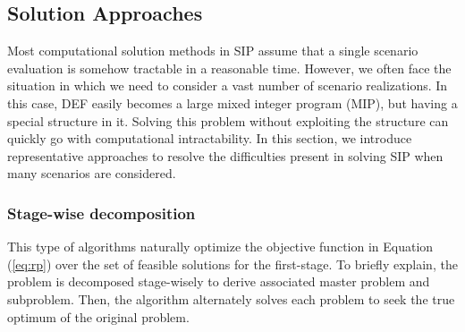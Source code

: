 

\subsection{Solution Approaches}
Most computational solution methods in SIP assume that a single scenario evaluation is somehow tractable in a reasonable time. However, we often face the situation in which we need to consider a vast number of scenario realizations. In this case, DEF easily becomes a large mixed integer program (MIP), but having a special structure in it. Solving this problem without exploiting the structure can quickly go with computational intractability. In this section, we introduce representative approaches to resolve the difficulties present in solving SIP when many scenarios are considered. 

\subsubsection{Stage-wise decomposition}
This type of algorithms naturally optimize the objective function in Equation (\ref{eq:rp}) over the set of feasible solutions for the first-stage. To briefly explain, the problem is decomposed stage-wisely to derive associated master problem and subproblem. Then, the algorithm alternately solves each problem to seek the true optimum of the original problem.
 
